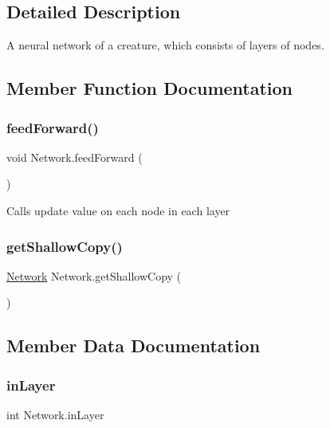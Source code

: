 \subsection{Detailed Description}
A neural network of a creature, which consists of layers of nodes. 



\subsection{Member Function Documentation}
\mbox{\label{class_network_a8285772739069a17a6cf3407208c25cb}} 
\subsubsection{\texorpdfstring{feed\+Forward()}{feedForward()}}
{\footnotesize\ttfamily void Network.\+feed\+Forward (\begin{DoxyParamCaption}{ }\end{DoxyParamCaption})}



Calls update value on each node in each layer 

\mbox{\label{class_network_a08970b95e111e12a0463719c959db247}} 
\subsubsection{\texorpdfstring{get\+Shallow\+Copy()}{getShallowCopy()}}
{\footnotesize\ttfamily \mbox{\hyperlink{class_network}{Network}} Network.\+get\+Shallow\+Copy (\begin{DoxyParamCaption}{ }\end{DoxyParamCaption})}



\subsection{Member Data Documentation}
\mbox{\label{class_network_a28e1ac9d80508cd8bb52624e4e1efede}} 
\subsubsection{\texorpdfstring{in\+Layer}{inLayer}}
{\footnotesize\ttfamily int Network.\+in\+Layer}

